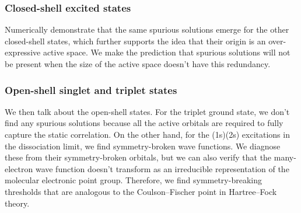 \documentclass[aip,jcp,reprint,noshowkeys,superscriptaddress]{revtex4-1}
\newcommand{\hugh}[1]{\textcolor{hughgreen}{#1}}
\begin{document}
\subsubsection{Closed-shell excited states}

\hugh{Numerically demonstrate that the same spurious solutions emerge for the other closed-shell states, which further 
supports the idea that their origin is an over-expressive active space.
We make the prediction that spurious solutions will not be present when the size of the active space doesn't have this
redundancy.}

\subsubsection{Open-shell singlet and triplet states}

\hugh{We then talk about the open-shell states. For the triplet ground state, we don't find any spurious solutions
because all the active orbitals are required to fully capture the static correlation. 
On the other hand, for the (1s)(2s) excitations in the dissociation limit, we find symmetry-broken wave functions. 
We diagnose these from their symmetry-broken orbitals, but we can also verify that the many-electron wave function doesn't 
transform as an irreducible representation of the molecular electronic point group.
Therefore, we find symmetry-breaking thresholds that are analogous to the Coulson--Fischer point in Hartree--Fock theory.
}
\end{document}
